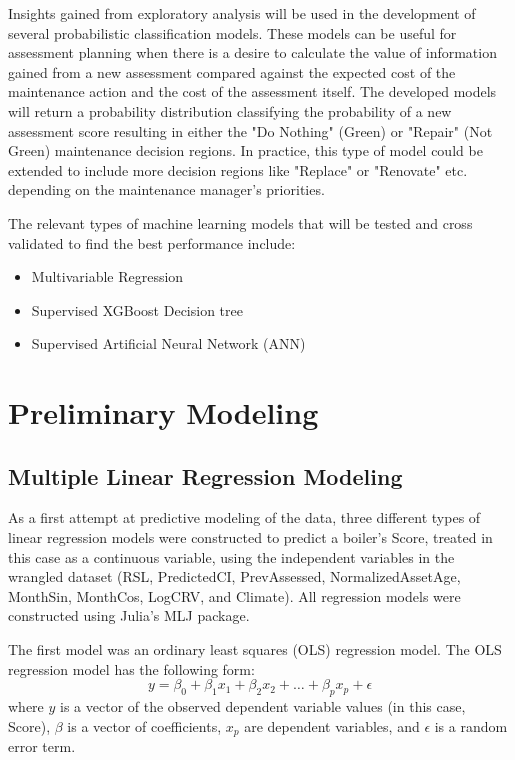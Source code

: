 \documentclass[NewProceedings,letterpaper,NoPageNumbers,NoLineNumbers, DoubleSpace]{ascelike-new}
\begin{document}
Insights gained from exploratory analysis will be used in the development of several probabilistic classification models.  These  models can be useful for assessment planning when there is a desire to calculate the value of information gained from a new assessment compared against the expected cost of the maintenance action and the cost of the assessment itself. The developed models will return a probability distribution classifying the probability of a new assessment score resulting in either the "Do Nothing" (Green) or "Repair" (Not Green) maintenance decision regions. In practice, this type of model could be extended to include more decision regions like "Replace" or "Renovate" etc. depending on the maintenance manager's priorities.

The relevant types of machine learning models that will be tested and cross validated to find the best performance include:

\begin{itemize}
    \item Multivariable Regression %
    \item Supervised XGBoost Decision tree %
    \item Supervised Artificial Neural Network (ANN) %
\end{itemize}

\FloatBarrier

\section{Preliminary Modeling}

\subsection{Multiple Linear Regression Modeling}

As a first attempt at predictive modeling of the data, three different types of linear regression models were constructed to predict a boiler's Score, treated in this case as a continuous variable, using the independent variables in the wrangled dataset (RSL, PredictedCI, PrevAssessed, NormalizedAssetAge, MonthSin, MonthCos, LogCRV, and Climate). All regression models were constructed using Julia's MLJ package.

The first model was an ordinary least squares (OLS) regression model. The OLS regression model has the following form:
\[
y = \beta_0 + \beta_1 x_1 + \beta_2 x_2 + \dots + \beta_p x_p + \epsilon
\]
where $y$ is a vector of the observed dependent variable values (in this case, Score), $\beta$ is a vector of coefficients, $x_p$ are dependent variables, and $\epsilon$ is a random error term.
\end{document}
